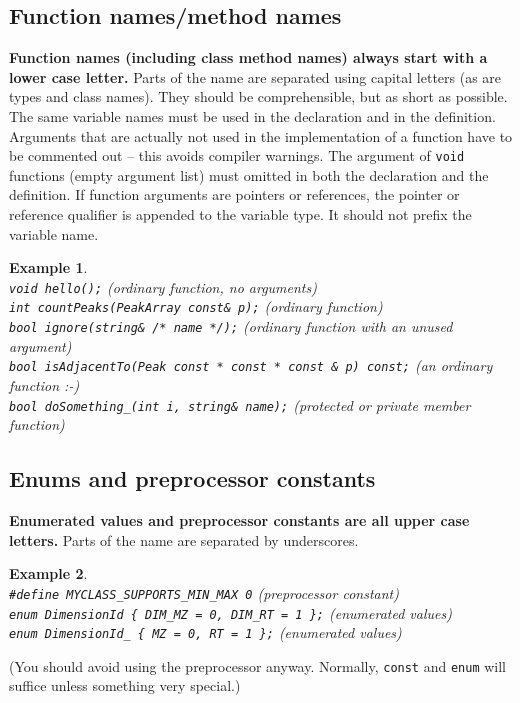 \documentclass[a4]{article}
\newtheorem{example}{Example}
\begin{document}
\subsection{Function names/method names}

\textbf{Function names (including class method names) always start with a
  lower case letter.}  Parts of the name are separated using capital letters
(as are types and class names).  They should be comprehensible, but as short
as possible.  The same variable names must be used in the declaration and in
the definition.  Arguments that are actually not used in the implementation of
a function have to be commented out -- this avoids compiler warnings.  The
argument of \texttt{void} functions (empty argument list) must omitted in both
the declaration and the definition.  If function arguments are pointers or
references, the pointer or reference qualifier is appended to the variable
type. It should not prefix the variable name.
\begin{example}~\\
{\tt void hello();} (ordinary function, no arguments) \\
{\tt int countPeaks(PeakArray const\& p);} (ordinary function) \\
{\tt bool ignore(string\& /* name */);} (ordinary function with an unused argument) \\
{\tt bool isAdjacentTo(Peak const * const * const \& p) const;} (an ordinary function :-) \\
{\tt bool doSomething\_(int i, string\& name);} (protected or private member function)
\end{example}


\subsection{Enums and preprocessor constants}

\textbf{Enumerated values and preprocessor constants are all upper case
  letters.}  Parts of the name are separated by underscores.
\begin{example}~\\
  {\tt \#define MYCLASS\_SUPPORTS\_MIN\_MAX 0} (preprocessor constant) \\
  {\tt enum DimensionId \{ DIM\_MZ = 0, DIM\_RT = 1 \};} (enumerated values) \\
  {\tt enum DimensionId\_ \{ MZ = 0, RT = 1 \};} (enumerated values)
\end{example}
(You should avoid using the preprocessor anyway.  Normally, \texttt{const} and
\texttt{enum} will suffice unless something very special.)
\end{document}
